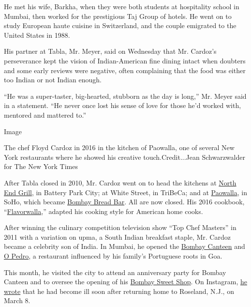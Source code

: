 He met his wife, Barkha, when they were both students at hospitality
school in Mumbai, then worked for the prestigious Taj Group of hotels.
He went on to study European haute cuisine in Switzerland, and the
couple emigrated to the United States in 1988.

His partner at Tabla, Mr. Meyer, said on Wednesday that Mr. Cardoz's
perseverance kept the vision of Indian-American fine dining intact when
doubters and some early reviews were negative, often complaining that
the food was either too Indian or not Indian enough.

``He was a super-taster, big-hearted, stubborn as the day is long,'' Mr.
Meyer said in a statement. ``He never once lost his sense of love for
those he'd worked with, mentored and mattered to.''

Image

The chef Floyd Cardoz in 2016 in the kitchen of Paowalla, one of several
New York restaurants where he showed his creative touch.Credit...Jean
Schwarzwalder for The New York Times

After Tabla closed in 2010, Mr. Cardoz went on to head the kitchens at
\href{https://www.nytimes3xbfgragh.onion/2015/01/28/dining/restaurant-review-blue-smoke-and-north-end-grill.html}{North
End Grill}, in Battery Park City; at White Street, in TriBeCa; and at
\href{https://www.nytimes3xbfgragh.onion/2016/11/09/dining/paowalla-review.html}{Paowalla},
in SoHo, which became
\href{https://www.nytimes3xbfgragh.onion/2018/02/15/dining/floyd-cardoz-paowalla-closing-bombay-bread-bar.html}{Bombay
Bread Bar}. All are now closed. His 2016 cookbook,
``\href{https://www.wnyc.org/story/flavorwalla/}{Flavorwalla},'' adapted
his cooking style for American home cooks.

After winning the culinary competition television show ``Top Chef
Masters'' in 2011 with a variation on upma, a South Indian breakfast
staple, Mr. Cardoz became a celebrity son of India. In Mumbai, he opened
the \href{http://thebombaycanteen.com/}{Bombay Canteen} and
\href{https://www.nytimes3xbfgragh.onion/2018/05/19/travel/o-pedro-restaurant-mumbai-review.html}{O
Pedro}, a restaurant influenced by his family's Portuguese roots in Goa.

This month, he visited the city to attend an anniversary party for
Bombay Canteen and to oversee the opening of his
\href{https://www.bombaysweetshop.com/}{Bombay Sweet Shop}. On
Instagram, \href{https://www.instagram.com/p/B92S1FunVEX/}{he wrote}
that he had become ill soon after returning home to Roseland, N.J., on
March 8.

